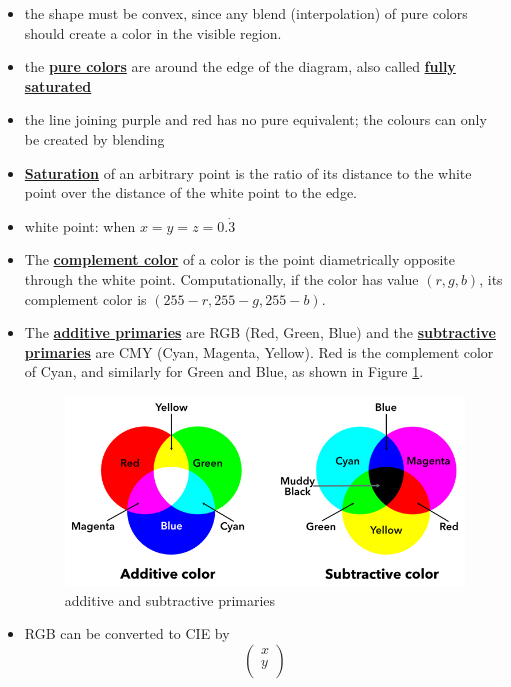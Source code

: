 \documentclass[twocolumn,landscape,10pt]{article}
\theoremstyle{definition}
\begin{document}
\begin{itemize}
    \item the shape must be convex, since any blend (interpolation) of pure
        colors should create a color in the visible region.
    \item the \underline{\textbf{pure colors}} are around the edge of the
        diagram, also called \underline{\textbf{fully saturated}}
    \item the line joining purple and red has no pure equivalent; the colours
        can only be created by blending
    \item \underline{\textbf{Saturation}} of an arbitrary point is the ratio of
        its distance to the white point over the distance of the white point to
        the edge.
    \item white point: when $x=y=z=0.\dot{3}$
    \item The \underline{\textbf{complement color}} of a color is the point
        diametrically opposite through the white point. Computationally, if the
        color has value $(r,g,b)$, its complement color is
        $(255-r,255-g,255-b)$.
    \item The \underline{\textbf{additive primaries}} are RGB (Red, Green, Blue)
        and the \underline{\textbf{subtractive primaries}} are CMY (Cyan,
        Magenta, Yellow).
        Red is the complement color of Cyan, and similarly for Green and Blue,
        as shown in Figure \ref{fig:primaries}.
        \begin{figure}
          	\includegraphics[scale=0.55]{primaries.png}
          	\centering
          	\caption{additive and subtractive primaries}\label{fig:primaries}
        \end{figure}
    \item RGB can be converted to CIE by
        \[
            \begin{pmatrix}
                x \\
                y \\

\end{pmatrix}\]
\end{itemize}
\end{document}
